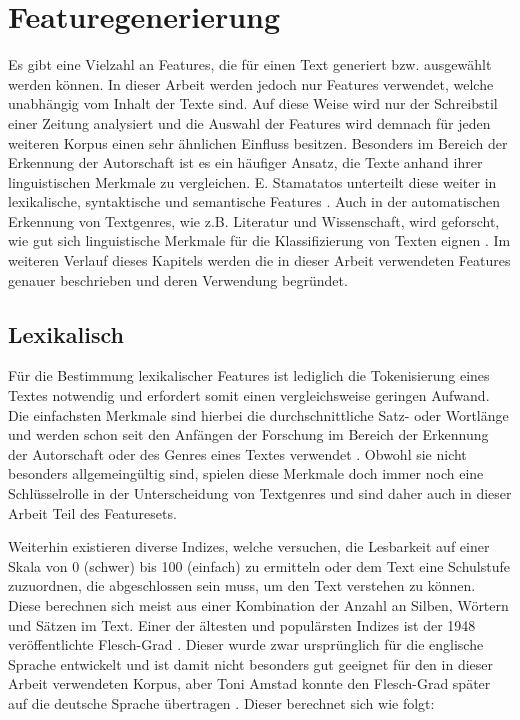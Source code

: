 \section{Featuregenerierung}\label{features}
Es gibt eine Vielzahl an Features, die für einen Text generiert bzw. ausgewählt werden können. In dieser Arbeit werden jedoch nur Features verwendet, welche unabhängig vom Inhalt der Texte sind. Auf diese Weise wird nur der Schreibstil einer Zeitung analysiert und die Auswahl der Features wird demnach für jeden weiteren Korpus einen sehr ähnlichen Einfluss besitzen. Besonders im Bereich der Erkennung der Autorschaft ist es ein häufiger Ansatz, die Texte anhand ihrer linguistischen Merkmale zu vergleichen. E. Stamatatos unterteilt diese weiter in lexikalische, syntaktische und semantische Features \cite{stamatatos2009survey}. Auch in der automatischen Erkennung von Textgenres, wie z.B. Literatur und Wissenschaft, wird geforscht, wie gut sich linguistische Merkmale für die Klassifizierung von Texten eignen \cite{cimino2017identifying}. Im weiteren Verlauf dieses Kapitels werden die in dieser Arbeit verwendeten Features genauer beschrieben und deren Verwendung begründet.

\subsection{Lexikalisch}
Für die Bestimmung lexikalischer Features ist lediglich die Tokenisierung eines Textes notwendig und erfordert somit einen vergleichsweise geringen Aufwand. Die einfachsten Merkmale sind hierbei die durchschnittliche Satz- oder Wortlänge und werden schon seit den Anfängen der Forschung im Bereich der Erkennung der Autorschaft oder des Genres eines Textes verwendet \cite[S.~473]{stamatatos2000automatic}. Obwohl sie nicht besonders allgemeingültig sind, spielen diese Merkmale doch immer noch eine Schlüsselrolle in der Unterscheidung von Textgenres \cite{cimino2017identifying} und sind daher auch in dieser Arbeit Teil des Featuresets.

Weiterhin existieren diverse Indizes, welche versuchen, die Lesbarkeit auf einer Skala von 0 (schwer) bis 100 (einfach) zu ermitteln oder dem Text eine Schulstufe zuzuordnen, die abgeschlossen sein muss, um den Text verstehen zu können. Diese berechnen sich meist aus einer Kombination der Anzahl an Silben, Wörtern und Sätzen im Text. Einer der ältesten und populärsten Indizes ist der 1948 veröffentlichte Flesch-Grad \cite{mccallum1982computer}. Dieser wurde zwar ursprünglich für die englische Sprache entwickelt und ist damit nicht besonders gut geeignet für den in dieser Arbeit verwendeten Korpus, aber Toni Amstad konnte den Flesch-Grad später auf die deutsche Sprache übertragen \cite[K.~9]{rottensteiner2010structure}. Dieser berechnet sich wie folgt:

